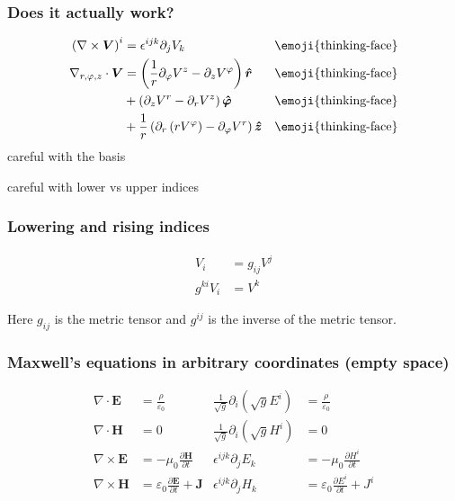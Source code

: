 \documentclass{beamer}
\begin{document}
\begin{frame}
\frametitle{Does it actually work?}
\begin{align*}
	\left(\nabla\times \boldsymbol{V}\right)^i
	&=\epsilon^{ijk}\partial_jV_k
	&\text{\emoji{thinking-face}}\\
	\nabla_{r,\varphi,z}\cdot \boldsymbol{V} 
	&= \left(\frac{1}{r}\partial_\varphi V^z
	-\partial_z V^\varphi\right)\boldsymbol{\hat{r}}
	&\text{\emoji{thinking-face}}\\
	&+\left(\partial_zV^r-\partial_rV^z\right)\boldsymbol{\hat{\varphi}}
	&\text{\emoji{thinking-face}}\\
	&+\frac{1}{r}\left(\partial_r\left(rV^\varphi\right)-\partial_\varphi
	V^r\right)\boldsymbol{\hat{z}}
	&\text{\emoji{thinking-face}}\\
\end{align*}
\centering
{} careful with the basis
\pause

 careful with lower vs upper indices
\end{frame}

\begin{frame}
\frametitle{Lowering and rising indices}
\begin{align*}
	V_i&=g_{ij}V^j\\
	g^{ki}V_i&=V^k
\end{align*}

Here \(g_{ij}\) is the metric tensor and \(g^{ij}\) is the inverse
of the metric tensor.
\end{frame}

\begin{frame}
\frametitle{Maxwell's equations in arbitrary coordinates (empty space)}
\begin{align*}
\nabla \cdot \boldsymbol{E} &= \frac{\rho}{\varepsilon_0} &\frac{1}{\sqrt{g}}\partial_i\left(\sqrt{g}E^i\right) &= \frac{\rho}{\varepsilon_0}\\
\nabla \cdot \boldsymbol{H} &= 0  		             &\frac{1}{\sqrt{g}}\partial_i\left(\sqrt{g}H^i\right) &=0 \\
\nabla\times \boldsymbol{E} &=-\mu_0\frac{\partial \boldsymbol{H}}{\partial t} &\epsilon^{ijk} \partial_jE_k &= -\mu_0\frac{\partial H^i}{\partial t}\\
\nabla\times \boldsymbol{H} &=\varepsilon_0\frac{\partial \boldsymbol{E}}{\partial t} + \boldsymbol{J} &\epsilon^{ijk} \partial_jH_k &= \varepsilon_0\frac{\partial E^i}{\partial t} + J^i
\end{align*}

\end{frame}
\end{document}
